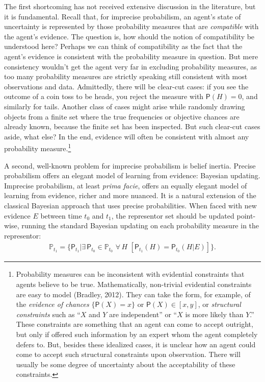 \documentclass[
  letterpaper,
  DIV=11,
  numbers=noendperiod]{scrartcl}
\begin{document}
The first shortcoming has not received extensive discussion in the
literature, but it is fundamental. Recall that, for imprecise
probabilism, an agent's state of uncertainty is represented by those
probability measures that are \emph{compatible} with the agent's
evidence. The question is, how should the notion of compatibility be
understood here? Perhaps we can think of compatibility as the fact that
the agent's evidence is consistent with the probability measure in
question. But mere consistency wouldn't get the agent very far in
excluding probability measures, as too many probability measures are
strictly speaking still consistent with most observations and data.
Admittedly, there will be clear-cut cases: if you see the outcome of a
coin toss to be heads, you reject the measure with \(\mathsf{P}(H)=0\),
and similarly for tails. Another class of cases might arise while
randomly drawing objects from a finite set where the true frequencies or
objective chances are already known, because the finite set has been
inspected. But such clear-cut cases aside, what else? In the end,
evidence will often be consistent with almost any probability
measure.\footnote{Probability measures can be inconsistent with
  evidential constraints that agents believe to be true. Mathematically,
  non-trivial evidential constraints are easy to model (Bradley, 2012).
  They can take the form, for example, of the \emph{evidence of chances}
  \(\{ \mathsf{P}(X) = x\}\) or \(\mathsf{P}(X) \in [x,y]\), or
  \emph{structural constraints} such as ``\(X\) and \(Y\) are
  independent'' or ``\(X\) is more likely than \(Y\).'' These
  constraints are something that an agent can come to accept outright,
  but only if offered such information by an expert whom the agent
  completely defers to. But, besides these idealized cases, it is
  unclear how an agent could come to accept such structural constraints
  upon observation. There will usually be some degree of uncertainty
  about the acceptability of these constraints.}

A second, well-known problem for imprecise probabilism is belief
inertia. Precise probabilism offers an elegant model of learning from
evidence: Bayesian updating. Imprecise probabilism, at least
\emph{prima facie}, offers an equally elegant model of learning from
evidence, richer and more nuanced. It is a natural extension of the
classical Bayesian approach that uses precise probabilities. When faced
with new evidence \(E\) between time \(t_0\) and \(t_1\), the
representor set should be updated point-wise, running the standard
Bayesian updating on each probability measure in the representor:
\begin{align*} \label{eq:updateRepresentor}
\mathbb{P}_{t_1} = \{\mathsf{P}_{t_1}\vert \exists\, {\mathsf{P}_{t_0} \!\in  \mathbb{P}_{t_0}}\,\, \forall\, {H}\,\, \left[\mathsf{P}_{t_1}(H)=\mathsf{P}_{t_0}(H \vert E)\right] \}.
\end{align*}
\end{document}
